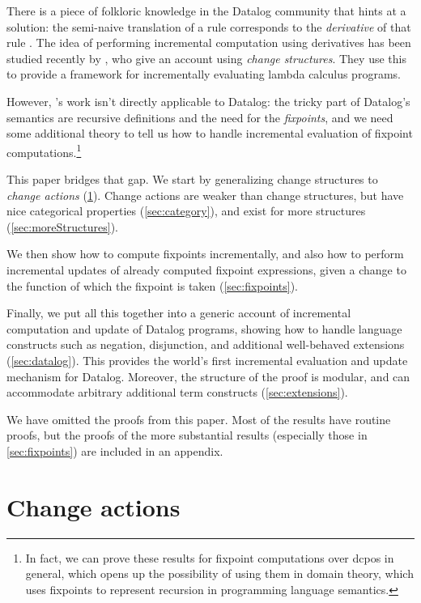 There is a piece of folkloric knowledge in the Datalog community that hints at a
solution: the semi-naive translation of a rule corresponds to the
\emph{derivative} of that rule \autocites{bancilhon1986naive}[section
3.2.2]{bancilhon1986amateur}. The idea of performing incremental computation using derivatives has been
studied recently by \textcite{cai2014changes}, who give an account using
\emph{change structures}. They use this to provide a framework for incrementally evaluating lambda calculus programs.

However, \citeauthor{cai2014changes}'s work isn't directly applicable to Datalog: the tricky part
of Datalog's semantics are recursive definitions and the need for the \emph{fixpoints}, and we need some additional theory to tell us how to
handle incremental evaluation of fixpoint computations.\footnote{In fact, we can prove these
results for fixpoint computations over dcpos in general, which opens up the
possibility of using them in domain theory, which uses fixpoints to
represent recursion in programming language semantics.}

This paper bridges that gap. We start by generalizing change structures to
\emph{change actions} (\cref{sec:changeActions}). Change actions are weaker than change structures, but
have nice categorical properties (\cref{sec:category}), and exist for more structures (\cref{sec:moreStructures}).

We then show how to compute fixpoints incrementally, and also how to perform
incremental updates of already computed fixpoint expressions, given a change to
the function of which the fixpoint is taken (\cref{sec:fixpoints}).

Finally, we put all this together into a generic account of incremental
computation and update of Datalog programs, showing how to handle 
language constructs such as negation, disjunction, and additional well-behaved
extensions (\cref{sec:datalog}). This provides the world's first incremental
evaluation and update mechanism for Datalog. Moreover, the structure of the
proof is modular, and can accommodate arbitrary additional
term constructs (\cref{sec:extensions}).

We have omitted the proofs from this paper. Most of the results have routine
proofs, but the proofs of the more substantial results
(especially those in \cref{sec:fixpoints}) are included in an appendix.

\section{Change actions}
\label{sec:changeActions}

